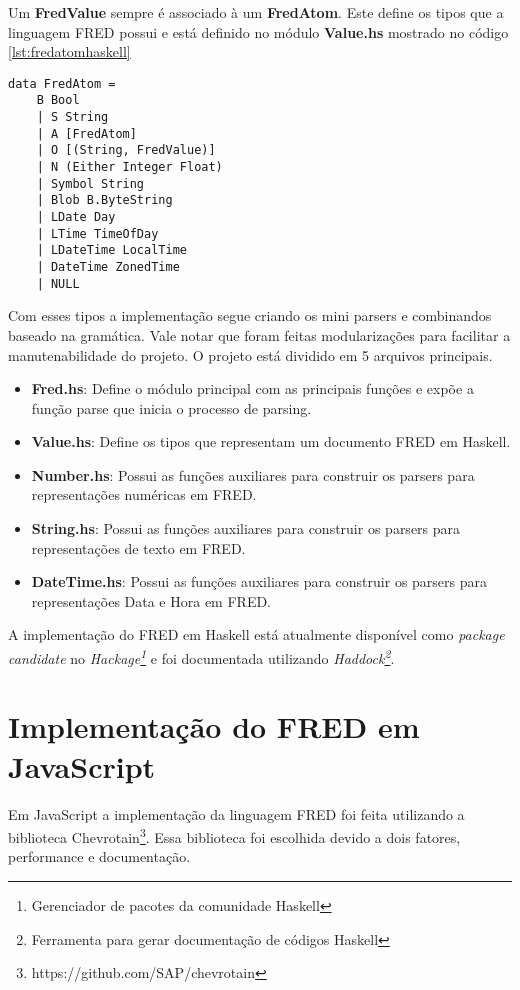 Um \textbf{FredValue} sempre é associado à um \textbf{FredAtom}. Este
define os tipos que a linguagem FRED possui e está definido no módulo \textbf{Value.hs}
mostrado no código \ref{lst:fredatomhaskell}

\begin{lstlisting}[caption=Definição do tipo FredAtom,label={lst:fredatomhaskell}]
data FredAtom =
    B Bool
    | S String
    | A [FredAtom]
    | O [(String, FredValue)]
    | N (Either Integer Float)
    | Symbol String
    | Blob B.ByteString
    | LDate Day
    | LTime TimeOfDay
    | LDateTime LocalTime
    | DateTime ZonedTime
    | NULL
\end{lstlisting}

Com esses tipos a implementação segue criando os mini parsers e combinandos baseado na gramática.
Vale notar que foram feitas modularizações para facilitar a manutenabilidade do projeto.
O projeto está dividido em 5 arquivos principais. 

\begin{itemize}
    \item \textbf{Fred.hs}: Define o módulo principal com as principais funções e expõe a 
    função parse que inicia o processo de parsing.
    \item \textbf{Value.hs}: Define os tipos que representam um documento FRED em Haskell.
    \item \textbf{Number.hs}: Possui as funções auxiliares para construir os parsers para
    representações numéricas em FRED.
    \item \textbf{String.hs}: Possui as funções auxiliares para construir os parsers para
    representações de texto em FRED.
    \item \textbf{DateTime.hs}: Possui as funções auxiliares para construir os parsers para
    representações Data e Hora em FRED.
\end{itemize}

A implementação do FRED em Haskell está atualmente disponível como \textit{package candidate} no 
\textit{Hackage\footnote{Gerenciador de pacotes da comunidade Haskell}} e foi documentada utilizando 
\textit{Haddock\footnote{Ferramenta para gerar documentação de códigos Haskell}}.

\section{Implementação do FRED em JavaScript}

Em JavaScript a implementação da linguagem FRED foi feita utilizando a biblioteca 
Chevrotain\footnote{https://github.com/SAP/chevrotain}. Essa biblioteca foi escolhida
devido a dois fatores, performance e documentação.

